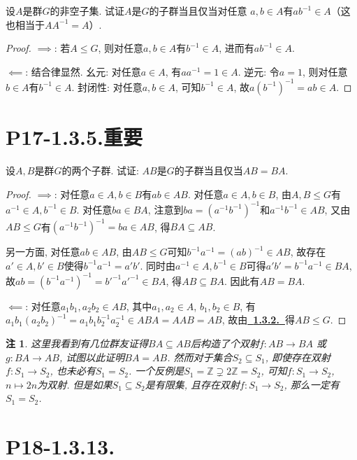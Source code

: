 \documentclass[12pt, a4paper, fontset=windows]{ctexart}
\newcommand{\Z}{\mathbb{Z}}
\newcommand{\kh}[1]{（{#1}）} %
\newcommand{\myref}[2][]{\hyperref[#1]{\bf\color{blue}\ {#2}\ }}
\newtheorem*{remark}{注}
\begin{document}
设$A$是群$G$的非空子集. 试证$A$是$G$的子群当且仅当对任意
$a,b\in A$有$ab^{-1}\in A$\kh{这也相当于$AA^{-1}=A$}. 

\begin{proof}
$\implies$: 
若$A\le G$, 则对任意$a,b\in A$有$b^{-1}\in A$, 进而有$ab^{-1}\in A$. 

$\impliedby$: 
结合律显然. 
幺元: 对任意$a\in A$, 有$aa^{-1}=1\in A$. 
逆元: 令$a=1$, 则对任意$b\in A$有$b^{-1}\in A$. 
封闭性: 对任意$a,b\in A$, 可知$b^{-1}\in A$, 
故$a(b^{-1})^{-1}=ab\in A$. 
\end{proof}

\section*{P17-1.3.5.\normalsize 重要}

设$A,B$是群$G$的两个子群. 试证: $AB$是$G$的子群当且仅当$AB=BA$. 

\begin{proof}
$\implies$: 对任意$a\in A,b\in B$有$ab\in AB$. 对任意$a\in A,b\in B$, 
由$A,B\le G$有$a^{-1}\in A,b^{-1}\in B$. 对任意$ba\in BA$, 
注意到$ba=(a^{-1}b^{-1})^{-1}$和$a^{-1}b^{-1}\in AB$, 
又由$AB\le G$有$(a^{-1}b^{-1})^{-1}=ba\in AB$, 得$BA\subseteq AB$. 

另一方面, 对任意$ab\in AB$, 由$AB\le G$可知$b^{-1}a^{-1}=
(ab)^{-1}\in AB$, 故存在$a'\in A,b'\in B$使得$b^{-1}a^{-1}=a'b'$. 
同时由$a^{-1}\in A,b^{-1}\in B$可得$a'b'=b^{-1}a^{-1}\in BA$,
故$ab=(b^{-1}a^{-1})^{-1}=b'^{-1}a'^{-1}\in BA$, 得$AB\subseteq BA$. 
因此有$AB=BA$. 

$\impliedby$: 对任意$a_1b_1,a_2b_2\in AB$, 其中$a_1,a_2\in A$, $b_1,b_2\in B$, 
有$a_1b_1(a_2b_2)^{-1}=a_1b_1b_2^{-1}a_2^{-1}\in ABA=AAB=AB$, 
故由\myref[subgroup]{1.3.2.}得$AB\le G$. 
\end{proof}

\begin{remark}
这里我看到有几位群友证得$BA\subseteq AB$后构造了个双射$f:AB\to BA$
或$g:BA\to AB$, 试图以此证明$BA=AB$. 然而对于集合$S_2\subseteq S_1$, 
即使存在双射$f:S_1\to S_2$, 也未必有$S_1=S_2$. 一个反例是$S_1=\Z\supsetneq 2\Z=S_2$, 
可知$f:S_1\to S_2$, $n\mapsto 2n$为双射. 但是如果$S_1\subseteq S_2$是有限集, 
且存在双射$f:S_1\to S_2$, 那么一定有$S_1=S_2$. 
\end{remark}

\section*{P18-1.3.13.}
\end{document}
